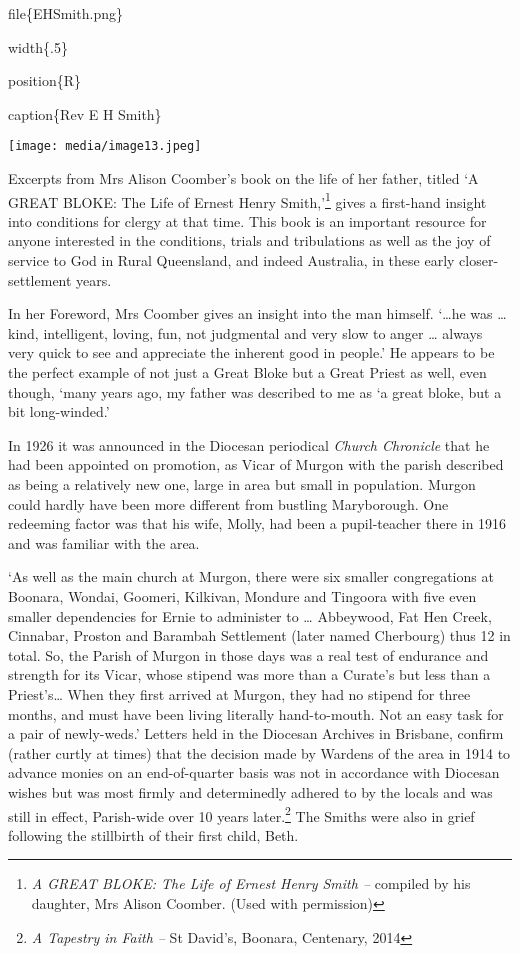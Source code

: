 file\{EHSmith.png\}

width\{.5\}

position\{R\}

caption\{Rev E H Smith\}

\texttt{[image: media/image13.jpeg]}

Excerpts from Mrs Alison Coomber's book on the life of her father,
titled `A GREAT BLOKE: The Life of Ernest Henry Smith,'\footnote{\emph{A
  GREAT BLOKE: The Life of Ernest Henry Smith --} compiled by his
  daughter, Mrs Alison Coomber. (Used with permission)} gives a
first-hand insight into conditions for clergy at that time. This book is
an important resource for anyone interested in the conditions, trials
and tribulations as well as the joy of service to God in Rural
Queensland, and indeed Australia, in these early closer-settlement
years.

In her Foreword, Mrs Coomber gives an insight into the man himself.
`\ldots he was \ldots{} kind, intelligent, loving, fun, not judgmental
and very slow to anger \ldots{} always very quick to see and appreciate
the inherent good in people.' He appears to be the perfect example of
not just a Great Bloke but a Great Priest as well, even though, `many
years ago, my father was described to me as `a great bloke, but a bit
long-winded.'

In 1926 it was announced in the Diocesan periodical \emph{Church
Chronicle} that he had been appointed on promotion, as Vicar of Murgon
with the parish described as being a relatively new one, large in area
but small in population. Murgon could hardly have been more different
from bustling Maryborough. One redeeming factor was that his wife,
Molly, had been a pupil-teacher there in 1916 and was familiar with the
area.

`As well as the main church at Murgon, there were six smaller
congregations at Boonara, Wondai, Goomeri, Kilkivan, Mondure and
Tingoora with five even smaller dependencies for Ernie to administer to
\ldots{} Abbeywood, Fat Hen Creek, Cinnabar, Proston and Barambah
Settlement (later named Cherbourg) thus 12 in total. So, the Parish of
Murgon in those days was a real test of endurance and strength for its
Vicar, whose stipend was more than a Curate's but less than a
Priest's\ldots{} When they first arrived at Murgon, they had no stipend
for three months, and must have been living literally hand-to-mouth. Not
an easy task for a pair of newly-weds.' Letters held in the Diocesan
Archives in Brisbane, confirm (rather curtly at times) that the decision
made by Wardens of the area in 1914 to advance monies on an
end-of-quarter basis was not in accordance with Diocesan wishes but was
most firmly and determinedly adhered to by the locals and was still in
effect, Parish-wide over 10 years later.\footnote{\emph{A Tapestry in
  Faith --} St David's, Boonara, Centenary, 2014} The Smiths were also
in grief following the stillbirth of their first child, Beth.

